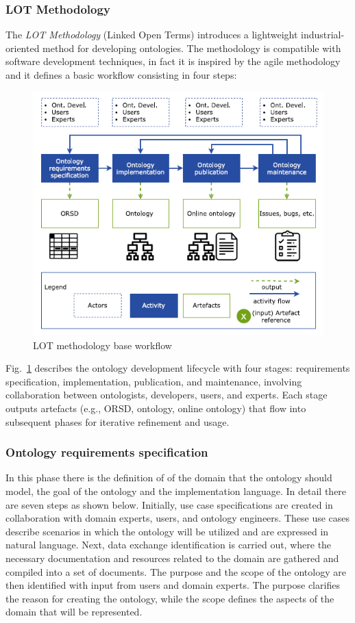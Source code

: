 \subsubsection{LOT Methodology}
The \textit{LOT Methodology} (Linked Open Terms) \cite{poveda2022lot} introduces a lightweight industrial-oriented method for developing ontologies.
The methodology is compatible with software development techniques, in fact it is inspired by the agile methodology and it defines a basic workflow consisting in four steps:
\begin{figure}[H]
    \centering
    \includegraphics[width=0.7\linewidth]{Figures/fig_3.png}
    \caption{LOT methodology base workflow}
    \label{fig:lot-workflow}
\end{figure}

Fig.~\ref{fig:lot-workflow} describes the ontology development lifecycle with four stages: requirements specification, implementation, publication, and maintenance, involving collaboration between ontologists, developers, users, and experts. Each stage outputs artefacts (e.g., ORSD, ontology, online ontology) that flow into subsequent phases for iterative refinement and usage.


\subsubsection{Ontology requirements specification}
In this phase there is the definition of of the domain that the ontology should model, the goal of the ontology and the implementation language. 
In detail there are seven steps as shown below.
Initially, use case specifications are created in collaboration with domain experts, users, and ontology engineers.
These use cases describe scenarios in which the ontology will be utilized and are expressed in natural language.
Next, data exchange identification is carried out, where the necessary documentation and resources related to the domain are gathered and compiled into a set of documents.
The purpose and the scope of the ontology are then identified with input from users and domain experts.
The purpose clarifies the reason for creating the ontology, while the scope defines the aspects of the domain that will be represented.


